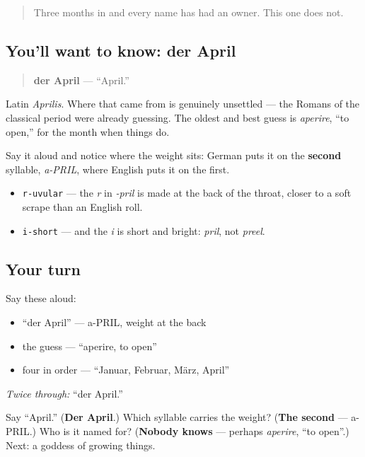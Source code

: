 \begin{quote}
Three months in and every name has had an owner. This one does not.
\end{quote}

\subsection*{You'll want to know: der April}
\begin{quote}
\textbf{der April} — \textquotedblleft{}April.\textquotedblright{}
\end{quote}

Latin \emph{Aprilis}. Where that came from is genuinely unsettled — the Romans of the classical period were already guessing. The oldest and best guess is \emph{aperire}, \textquotedblleft{}to open,\textquotedblright{} for the month when things do.

Say it aloud and notice where the weight sits: German puts it on the \textbf{second} syllable, \emph{a-PRIL}, where English puts it on the first.

\begin{sounds}
\begin{itemize}
\raggedright
  \item \texttt{r-uvular} — the \emph{r} in \emph{-pril} is made at the back of the throat, closer to a soft scrape than an English roll.
  \item \texttt{i-short} — and the \emph{i} is short and bright: \emph{pril}, not \emph{preel}.
\end{itemize}
\end{sounds}

\subsection*{Your turn}
Say these aloud:

\begin{itemize}
\raggedright
  \item \textquotedblleft{}der April\textquotedblright{} — a-PRIL, weight at the back
  \item the guess — \textquotedblleft{}aperire, to open\textquotedblright{}
  \item four in order — \textquotedblleft{}Januar, Februar, März, April\textquotedblright{}
\end{itemize}

\emph{Twice through:} \textquotedblleft{}der April.\textquotedblright{}

\begin{tcolorbox}[breakable,colback=teal!4,colframe=teal!35!black,title={Before you move on}]
Say \textquotedblleft{}April.\textquotedblright{} (\textbf{Der April}.) Which syllable carries the weight? (\textbf{The second} — a-PRIL.) Who is it named for? (\textbf{Nobody knows} — perhaps \emph{aperire}, \textquotedblleft{}to open\textquotedblright{}.) Next: a goddess of growing things.
\end{tcolorbox}
